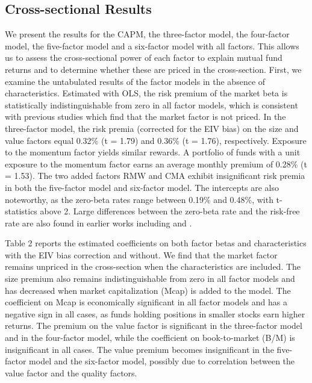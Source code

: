 \subsection{Cross-sectional Results}
\label{results}
We present the results for the CAPM, the \citet{fama1993common} three-factor model, the \citet{carhart1997persistence} four-factor model, the \citet{FAMA20151} five-factor model and a six-factor model with all factors. This allows us to assess the cross-sectional power of each factor to explain mutual fund returns and to determine whether these are priced in the cross-section. First, we examine the untabulated results of the factor models in the absence of characteristics. Estimated with OLS, the risk premium of the market beta is statistically indistinguishable from zero in all factor models, which is consistent with previous studies which find that the market factor is not priced. In the three-factor model, the risk premia (corrected for the EIV bias) on the size and value factors equal 0.32\% (t = 1.79) and 0.36\% (t = 1.76), respectively. Exposure to the momentum factor yields similar rewards. A portfolio of funds with a unit exposure to the momentum factor earns an average monthly premium of 0.28\% (t = 1.53). The two added factors RMW and CMA exhibit insignificant risk premia in both the five-factor model and six-factor model. The intercepts are also noteworthy, as the zero-beta rates range between 0.19\% and 0.48\%, with t-statistics above 2. Large differences between the zero-beta rate and the risk-free rate are also found in earlier works including \citet{lewellen2010skeptical} and \citet{frazzini2014betting}. 
\par Table 2 reports the estimated coefficients on both factor betas and characteristics with the EIV bias correction and without. We find that the market factor remains unpriced in the cross-section when the characteristics are included. The size premium also remains indistinguishable from zero in all factor models and has decreased when  market capitalization (Mcap) is added to the model. The coefficient on Mcap is economically significant in all factor models and has a negative sign in all cases, as funds holding positions in smaller stocks earn higher returns. The premium on the value factor is significant in the three-factor model and in the four-factor model, while the coefficient on book-to-market (B/M) is insignificant in all cases. The value premium becomes insignificant in the five-factor model and the six-factor model, possibly due to correlation between the value factor and the quality factors.

